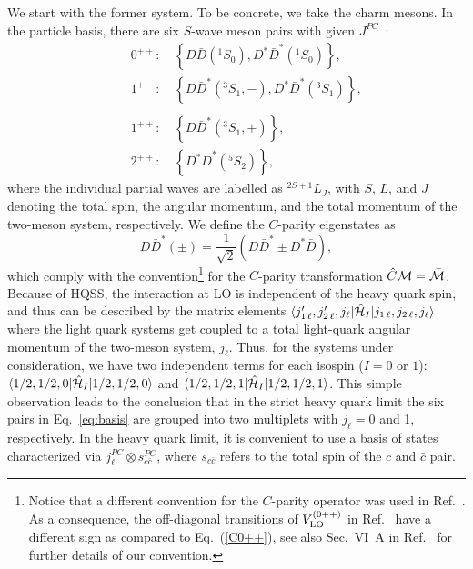 We start with the former system. To be concrete, we take the charm mesons. In
the particle basis, there are six $S$-wave meson pairs with given 
$J^{PC}$~\cite{Nieves:2012tt}:
\begin{eqnarray}
&&0^{++}:\quad\left\{D\bar{D}({^1S_0}),D^*\bar{D}^*({^1S_0})\right\},\nonumber\\
&&1^{+-}:\quad\left\{D\bar{D}^*({^3S_1},-),D^*\bar{D}^*({^3S_1})\right\},
\nonumber\\[-3mm]
\label{eq:basis}  \\[-3mm]
&&1^{++}:\quad\left\{D\bar{D}^*({^3S_1},+)\right\},\nonumber\\
&&2^{++}:\quad\left\{D^*\bar{D}^*({^5S_2})\right\},\nonumber
\end{eqnarray}
where the individual partial waves are labelled as $^{2S+1}L_J$, with $S$, $L$, 
and $J$ denoting the total spin, the angular momentum, and the total momentum 
of the two-meson system, respectively. We define the $C$-parity eigenstates as
\begin{equation}
D\bar{D}^*(\pm)=\frac{1}{\sqrt{2}}\left(D\bar{D}^*\pm D^*\bar{D}\right), \label{eq:DDstar}
\end{equation}
which comply with the convention\footnote{
Notice that a different convention for the $C$-parity operator was used in
Ref.~\cite{Nieves:2012tt}. As a consequence, the off-diagonal transitions
of $V_{\rm LO}^{(0{++})}$ in Ref.~\cite{Nieves:2012tt} have a different sign as 
compared to Eq.~(\ref{C0++}), see also
Sec.~VI~A in Ref.~\cite{Guo:2016bjq} for further
 details of our convention.}
 for the $C$-parity transformation $\hat{C}{\cal M}=\bar{\cal M}$.
%
Because of HQSS, the interaction at LO is independent of the heavy
quark spin, and thus can be described by the matrix elements  $\langle j_{1\, 
\ell}',
j_{2\, \ell}',{j_\ell}| \hat{\mathcal{H}}_I |  j_{1\, \ell}, j_{2\, \ell},{j_\ell} 
\rangle$ where
the light quark systems get coupled to a total light-quark angular momentum of 
the two-meson system, $j_\ell$.
 Thus, for the systems under
consideration, we have two independent terms for each isospin ($I=0$ or $1$):
  $\langle 1/2,1/2,0 | \hat{\mathcal{H}}_I | 1/2,1/2,0 \rangle$ and $
\langle 1/2,1/2,1 | \hat{\mathcal{H}}_I | 1/2,1/2,1 \rangle $.
This simple observation leads to the conclusion that in the strict heavy quark
limit the six pairs in Eq.~\eqref{eq:basis} are grouped into two
multiplets with $j_\ell=0$ and 1, respectively.
In the heavy quark limit, it is convenient to
use a basis of states characterized via ${j_\ell^{PC}}\otimes {s_{c\bar c}^{PC} 
}$, where $s_{c\bar
c}$ refers to the total spin of the $c$ and $\bar c$ pair.
